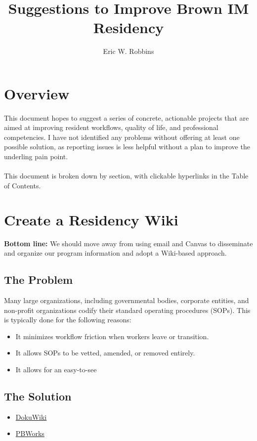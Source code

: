 \documentclass[]{article}
\title{Suggestions to Improve Brown IM Residency}
\author{Eric W. Robbins}
\begin{document}
\maketitle
\tableofcontents
	\section{Overview}
	\paragraph{}
		This document hopes to suggest a series of concrete, actionable projects that are aimed at improving resident workflows, quality of life, and professional competencies.
		I have not identified any problems without offering at least one possible solution, as reporting issues is less helpful without a plan to improve the underling pain point.
	\paragraph{}
		This document is broken down by section, with clickable hyperlinks in the Table of Contents.
	\section{Create a Residency Wiki}
		\textbf{Bottom line:} We should move away from using email and Canvas to disseminate and organize our program information and adopt a Wiki-based approach.
		\subsection{The Problem}
		Many large organizations, including governmental bodies, corporate entities, and non-profit organizations codify their standard operating procedures (SOPs).
		This is typically done for the following reasons:
			\begin{itemize}
				\item It minimizes workflow friction when workers leave or transition.
				\item It allows SOPs to be vetted, amended, or removed entirely.
				\item It allows for an easy-to-see 
			\end{itemize}
		\subsection{The Solution}
			\begin{itemize}
				\item \href{https://www.dokuwiki.org/dokuwiki}{DokuWiki}
				\item \href{https://www.pbworks.com/}{PBWorks}
			\end{itemize}
			
\end{document}
